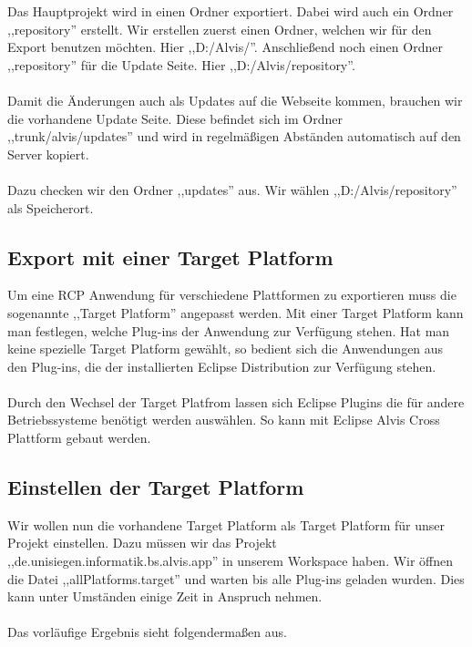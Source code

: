 \documentclass[10pt,a4paper,oneside]{scrbook}
\begin{document}
Das Hauptprojekt wird in einen Ordner exportiert. Dabei wird auch ein Ordner ,,repository'' erstellt. Wir erstellen zuerst einen Ordner, welchen wir für den Export benutzen möchten. Hier ,,D:/Alvis/''. Anschließend noch einen Ordner ,,repository'' für die Update Seite. Hier ,,D:/Alvis/repository''.
\\ \\
Damit die Änderungen auch als Updates auf die Webseite kommen, brauchen wir die vorhandene Update Seite. Diese befindet sich im Ordner ,,trunk/alvis/updates'' und wird in regelmäßigen Abständen automatisch auf den Server kopiert. 
\\ \\
Dazu checken wir den Ordner ,,updates'' aus. Wir wählen ,,D:/Alvis/repository'' als Speicherort.
\subsection{Export mit einer Target Platform}
Um eine RCP Anwendung für verschiedene Plattformen zu exportieren muss die sogenannte ,,Target Platform'' angepasst werden. Mit einer Target Platform kann man festlegen, welche Plug-ins der Anwendung zur Verfügung stehen. Hat man keine spezielle Target Platform gewählt, so bedient sich die Anwendungen aus den Plug-ins, die der installierten Eclipse Distribution zur Verfügung stehen.
\\
\\
Durch den Wechsel der Target Platfrom lassen sich Eclipse Plugins die für andere Betriebssysteme benötigt werden auswählen. So kann mit Eclipse Alvis Cross Plattform gebaut werden.

\subsection{Einstellen der Target Platform}
Wir wollen nun die vorhandene Target Platform als Target Platform für unser Projekt einstellen. Dazu müssen wir das Projekt\\
,,de.unisiegen.informatik.bs.alvis.app'' in unserem Workspace haben. Wir öffnen die Datei ,,allPlatforms.target'' und warten bis alle Plug-ins geladen wurden. Dies kann unter Umständen einige Zeit in Anspruch nehmen. 
\\ \\
Das vorläufige Ergebnis sieht folgendermaßen aus.
\begin{center}
\end{center}
\end{document}
